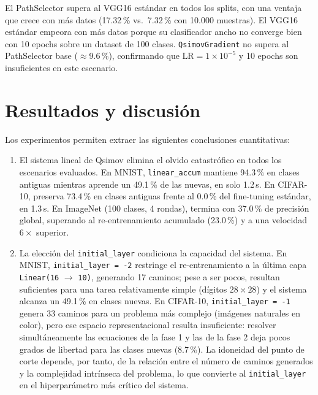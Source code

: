El PathSelector supera al VGG16 estándar en todos los splits, con una ventaja que crece con más
datos (17.32\,\% vs.\ 7.32\,\% con 10.000 muestras). El VGG16 estándar empeora con más datos
porque su clasificador ancho no converge bien con 10 epochs sobre un dataset de 100 clases.
\texttt{QsimovGradient} no supera al PathSelector base ($\approx$9.6\,\%), confirmando que
LR$=1\times10^{-5}$ y 10 epochs son insuficientes en este escenario.

\section{Resultados y discusión}

Los experimentos permiten extraer las siguientes conclusiones cuantitativas:

\begin{enumerate}
  \item El sistema lineal de Qsimov elimina el olvido catastrófico en todos los escenarios
        evaluados. En MNIST, \texttt{linear\_accum} mantiene 94.3\,\% en clases antiguas mientras
        aprende un 49.1\,\% de las nuevas, en solo 1.2\,s. En CIFAR-10, preserva 73.4\,\% en
        clases antiguas frente al 0.0\,\% del fine-tuning estándar, en 1.3\,s. En ImageNet (100
        clases, 4 rondas), termina con 37.0\,\% de precisión global, superando al re-entrenamiento
        acumulado (23.0\,\%) y a una velocidad $6\times$ superior.

  \item La elección del \texttt{initial\_layer} condiciona la capacidad del sistema. En
        MNIST, \texttt{initial\_layer = -2} restringe el re-entrenamiento a la última capa
        \texttt{Linear(16} $\rightarrow$ \texttt{10)}, generando 17 caminos; pese a ser pocos, resultan
        suficientes para una tarea relativamente simple (dígitos $28 \times 28$) y el sistema
        alcanza un 49.1\,\% en clases nuevas. En CIFAR-10, \texttt{initial\_layer = -1} genera 33
        caminos para un problema más complejo (imágenes naturales en color), pero ese espacio
        representacional resulta insuficiente: resolver simultáneamente las ecuaciones de la fase 1
        y las de la fase 2 deja pocos grados de libertad para las clases nuevas (8.7\,\%). La
        idoneidad del punto de corte depende, por tanto, de la relación entre el número de caminos
        generados y la complejidad intrínseca del problema, lo que convierte al
        \texttt{initial\_layer} en el hiperparámetro más crítico del sistema.


\end{enumerate}
